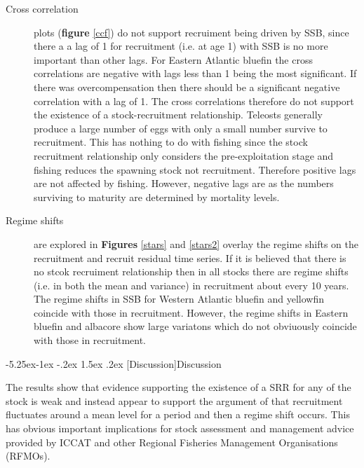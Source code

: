 \documentclass[a4paper, 10pt]{article}
\makeatletter
\renewcommand{\section}{\@startsection{section}{1}{\z@}%
  {-5.25ex\@plus -1ex \@minus -.2ex}%
  {1.5ex \@plus .2ex}%
  {\normalfont\bfseries}}
\makeatother
\begin{document}
\begin{description}
 \item[Cross correlation] plots (\textbf{figure} \ref{ccf}) do not support recruiment being
 driven by SSB, since there a a lag of 1 for recruitment (i.e. at age 1) with SSB is no more important than other lags. 
 For Eastern Atlantic bluefin
 the cross correlations are negative with lags less than 1 being the most significant. If there was overcompensation
 then there should be a significant negative correlation with a lag of 1. The cross correlations therefore do not support
 the existence of a stock-recruitment relationship. 
 Teleosts generally produce a large number of eggs with only a small number survive to recruitment. 
 This has nothing to do with fishing since the stock recruitment relationship only considers the pre-exploitation stage and fishing 
 reduces the spawning stock not recruitment. Therefore positive lags are not affected by fishing. However, negative lags
 are as the numbers surviving to maturity are determined by mortality levels.
 
 \item[Regime shifts] are explored in \textbf{Figures} \ref{stars} and  \ref{stars2} overlay the regime shifts on the recruitment and recruit residual time 
 series. If it is believed that there is no stcok recruiment relationship then in all stocks there are regime shifts (i.e.
 in both the mean and variance) in recruitment about every 10 years.
 The regime shifts in SSB for Western Atlantic bluefin and yellowfin coincide with those in recruitment. However, the regime shifts
 in Eastern bluefin and albacore show large variatons which do not obviuously coincide with those in recruitment.
\end{description}

\section[Discussion]{Discussion}

The results show that evidence supporting the existence of a SRR for any of the stock is weak and
instead appear to support the argument of \cite{gilbert_towards_1997} that recruitment fluctuates around a 
mean level for a period and then a regime shift occurs. This has obvious important implications for 
stock assessment and management advice provided by ICCAT and other Regional Fisheries Management
Organisations (RFMOs).
\end{document}

